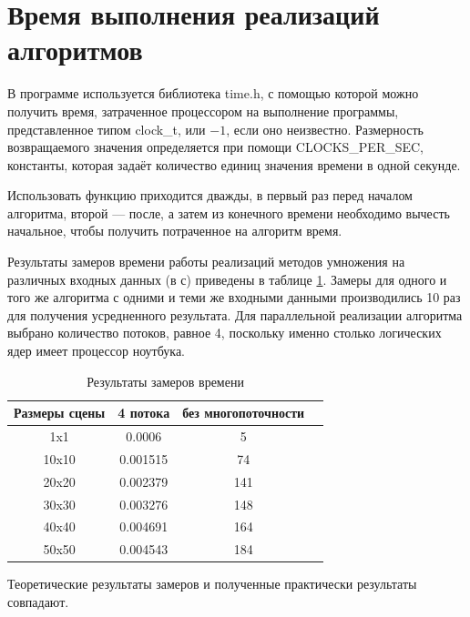 \section{Время выполнения реализаций алгоритмов}

В программе используется библиотека time.h, с помощью которой можно получить время, затраченное процессором на выполнение программы, представленное типом clock\_t, или $-1$, если оно неизвестно. Размерность возвращаемого значения определяется при помощи CLOCKS\_PER\_SEC, константы, которая задаёт количество единиц значения времени в одной секунде.

Использовать функцию приходится дважды, в первый раз перед началом алгоритма, второй — после, а затем из конечного времени необходимо вычесть начальное, чтобы получить потраченное на алгоритм время.

Результаты замеров времени работы реализаций методов умножения на различных входных данных (в с) приведены в таблице \ref{tbl:times}. Замеры для одного и того же алгоритма с одними и теми же входными данными производились 10 раз для получения усредненного результата. Для параллельной реализации алгоритма выбрано количество потоков, равное 4, поскольку именно столько логических ядер имеет процессор ноутбука.

\begin{table}[h]
	\begin{center}
		\begin{threeparttable}
			\captionsetup{justification=raggedright,singlelinecheck=off}
			\caption{\label{tbl:times}Результаты замеров времени}
			\begin{tabular}{|c|c|c|c|}
				\hline
				Размеры сцены &4 потока &без многопоточности\\
				\hline
				1x1 & 0.0006 & 5\\ 
				\hline
				10x10 & 0.001515 & 74\\ 
				\hline
				20x20 & 0.002379 & 141\\ 
				\hline
				30x30 & 0.003276 & 148\\ 
				\hline
				40x40 & 0.004691 & 164\\ 
				\hline
				50x50 & 0.004543 & 184\\
				\hline
			\end{tabular}
		\end{threeparttable}
	\end{center}
\end{table}

Теоретические результаты замеров и полученные практически результаты совпадают.

